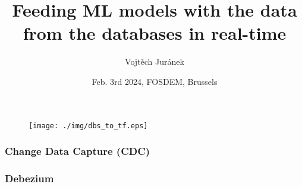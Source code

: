 \documentclass[10pt,utf8]{beamer}
\title{Feeding ML models with the data from the databases in real-time}
\author{Vojtěch Juránek}
\institute[Red Hat]{Red Hat}
\date{Feb. 3rd 2024, FOSDEM, Brussels}
\begin{document}


\begin{frame}
 \titlepage
\end{frame}


\begin{frame}
    \begin{figure}
        \centering
        \texttt{[image: ./img/dbs\_to\_tf.eps]}
    \end{figure}
\end{frame}

\begin{frame}
    \frametitle{Change Data Capture (CDC)}
\end{frame}

\begin{frame}
    \frametitle{Debezium}
\end{frame}
\end{document}
